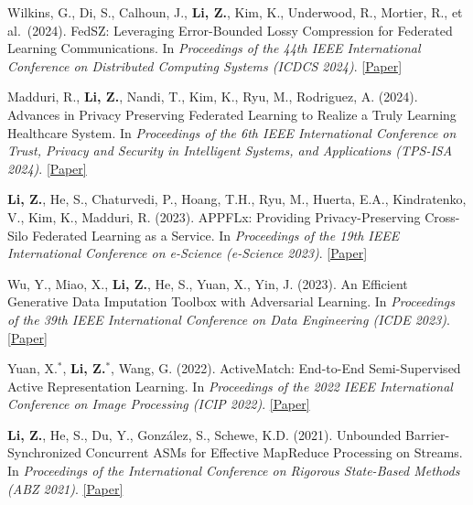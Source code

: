 \documentclass[letterpaper,11pt]{article}
\begin{document}
\begin{enumerate}[leftmargin=1cm, label={[\arabic*]}, itemsep=3pt]
  \item Wilkins, G., Di, S., Calhoun, J., \textbf{Li, Z.}, Kim, K., Underwood, R., Mortier, R., et al.\ (2024). FedSZ: Leveraging Error-Bounded Lossy Compression for Federated Learning Communications. In \textit{Proceedings of the 44th IEEE International Conference on Distributed Computing Systems (ICDCS 2024)}. \href{https://arxiv.org/abs/2312.13461}{[Paper]}

  \item Madduri, R., \textbf{Li, Z.}, Nandi, T., Kim, K., Ryu, M., Rodriguez, A. (2024). Advances in Privacy Preserving Federated Learning to Realize a Truly Learning Healthcare System. In \textit{Proceedings of the 6th IEEE International Conference on Trust, Privacy and Security in Intelligent Systems, and Applications (TPS-ISA 2024)}. \href{https://arxiv.org/abs/2409.19756}{[Paper]}

  \item \textbf{Li, Z.}, He, S., Chaturvedi, P., Hoang, T.H., Ryu, M., Huerta, E.A., Kindratenko, V., Kim, K., Madduri, R. (2023). APPFLx: Providing Privacy-Preserving Cross-Silo Federated Learning as a Service. In \textit{Proceedings of the 19th IEEE International Conference on e-Science (e-Science 2023)}. \href{https://arxiv.org/abs/2308.08786}{[Paper]}

  \item Wu, Y., Miao, X., \textbf{Li, Z.}, He, S., Yuan, X., Yin, J. (2023). An Efficient Generative Data Imputation Toolbox with Adversarial Learning. In \textit{Proceedings of the 39th IEEE International Conference on Data Engineering (ICDE 2023)}. \href{https://ieeexplore.ieee.org/abstract/document/10184711}{[Paper]}

  \item Yuan, X.$^*$, \textbf{Li, Z.$^*$}, Wang, G. (2022). ActiveMatch: End-to-End Semi-Supervised Active Representation Learning. In \textit{Proceedings of the 2022 IEEE International Conference on Image Processing (ICIP 2022)}. \href{https://arxiv.org/abs/2110.02521}{[Paper]}

  \item \textbf{Li, Z.}, He, S., Du, Y., Gonz\'{a}lez, S., Schewe, K.D. (2021). Unbounded Barrier-Synchronized Concurrent ASMs for Effective MapReduce Processing on Streams. In \textit{Proceedings of the International Conference on Rigorous State-Based Methods (ABZ 2021)}. \href{https://doi.org/10.1007/978-3-030-77543-8_1}{[Paper]}
\end{enumerate}

\vspace{-6pt}
\end{document}
